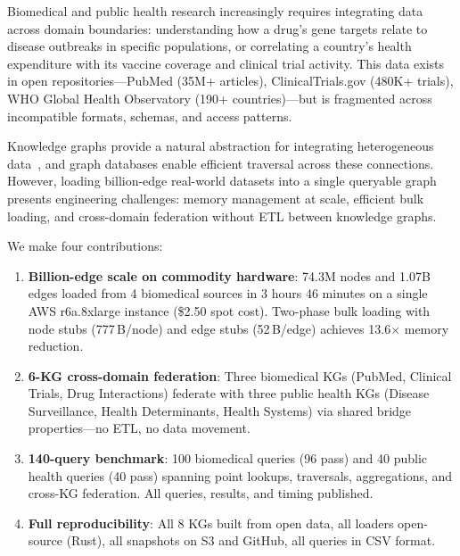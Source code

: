 \documentclass[11pt]{article}
\begin{document}
Biomedical and public health research increasingly requires integrating data across domain boundaries: understanding how a drug's gene targets relate to disease outbreaks in specific populations, or correlating a country's health expenditure with its vaccine coverage and clinical trial activity. This data exists in open repositories---PubMed (35M+ articles), ClinicalTrials.gov (480K+ trials), WHO Global Health Observatory (190+ countries)---but is fragmented across incompatible formats, schemas, and access patterns.

Knowledge graphs provide a natural abstraction for integrating heterogeneous data~\citep{hogan2021knowledge}, and graph databases enable efficient traversal across these connections. However, loading billion-edge real-world datasets into a single queryable graph presents engineering challenges: memory management at scale, efficient bulk loading, and cross-domain federation without ETL between knowledge graphs.

We make four contributions:

\begin{enumerate}[leftmargin=*]
  \item \textbf{Billion-edge scale on commodity hardware}: 74.3M nodes and 1.07B edges loaded from 4 biomedical sources in 3 hours 46 minutes on a single AWS r6a.8xlarge instance (\$2.50 spot cost). Two-phase bulk loading with node stubs (777\,B/node) and edge stubs (52\,B/edge) achieves 13.6$\times$ memory reduction.

  \item \textbf{6-KG cross-domain federation}: Three biomedical KGs (PubMed, Clinical Trials, Drug Interactions) federate with three public health KGs (Disease Surveillance, Health Determinants, Health Systems) via shared bridge properties---no ETL, no data movement.

  \item \textbf{140-query benchmark}: 100 biomedical queries (96 pass) and 40 public health queries (40 pass) spanning point lookups, traversals, aggregations, and cross-KG federation. All queries, results, and timing published.

  \item \textbf{Full reproducibility}: All 8 KGs built from open data, all loaders open-source (Rust), all snapshots on S3 and GitHub, all queries in CSV format.
\end{enumerate}

\end{document}
